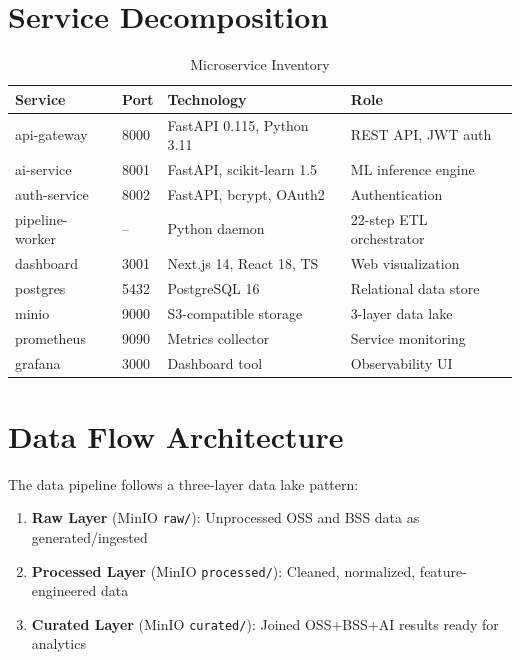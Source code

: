 \section{Service Decomposition}

\begin{table}[H]
\centering
\caption{Microservice Inventory}
\label{tab:services}
\begin{tabular}{@{}llll@{}}
\toprule
\textbf{Service} & \textbf{Port} & \textbf{Technology} & \textbf{Role} \\
\midrule
api-gateway & 8000 & FastAPI 0.115, Python 3.11 & REST API, JWT auth \\
ai-service & 8001 & FastAPI, scikit-learn 1.5 & ML inference engine \\
auth-service & 8002 & FastAPI, bcrypt, OAuth2 & Authentication \\
pipeline-worker & -- & Python daemon & 22-step ETL orchestrator \\
dashboard & 3001 & Next.js 14, React 18, TS & Web visualization \\
postgres & 5432 & PostgreSQL 16 & Relational data store \\
minio & 9000 & S3-compatible storage & 3-layer data lake \\
prometheus & 9090 & Metrics collector & Service monitoring \\
grafana & 3000 & Dashboard tool & Observability UI \\
\bottomrule
\end{tabular}
\end{table}

\section{Data Flow Architecture}

The data pipeline follows a three-layer data lake pattern:

\begin{enumerate}
    \item \textbf{Raw Layer} (MinIO \texttt{raw/}): Unprocessed OSS and BSS data as generated/ingested
    \item \textbf{Processed Layer} (MinIO \texttt{processed/}): Cleaned, normalized, feature-engineered data
    \item \textbf{Curated Layer} (MinIO \texttt{curated/}): Joined OSS+BSS+AI results ready for analytics
\end{enumerate}

